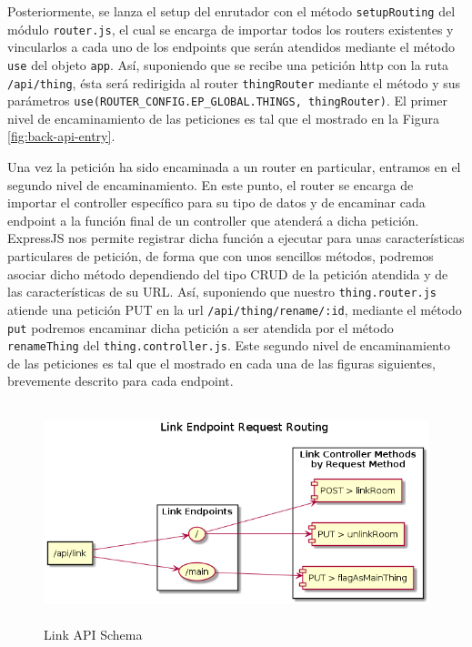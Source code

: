 \vspace{0.5cm}

Posteriormente, se lanza el setup del enrutador con el método \verb|setupRouting| del módulo \verb|router.js|, el cual se encarga de importar todos los routers existentes y vincularlos a cada uno de los endpoints que serán atendidos mediante el método \verb|use| del objeto \verb|app|. Así, suponiendo que se recibe una petición http con la ruta \verb|/api/thing|, ésta será redirigida al router \verb|thingRouter| mediante el método y sus parámetros \verb|use(ROUTER_CONFIG.EP_GLOBAL.THINGS, thingRouter)|. El primer nivel de encaminamiento de las peticiones es tal que el mostrado en la Figura \ref{fig:back-api-entry}.

\vspace{0.5cm}

Una vez la petición ha sido encaminada a un router en particular, entramos en el segundo nivel de encaminamiento. En este punto, el router se encarga de importar el controller específico para su tipo de datos y de encaminar cada endpoint a la función final de un controller que atenderá a dicha petición. ExpressJS nos permite registrar dicha función a ejecutar para unas características particulares de petición, de forma que con unos sencillos métodos, podremos asociar dicho método dependiendo del tipo CRUD de la petición atendida y de las características de su URL. Así, suponiendo que nuestro \verb|thing.router.js| atiende una petición PUT en la url \verb|/api/thing/rename/:id|, mediante el método \verb|put| podremos encaminar dicha petición a ser atendida por el método \verb|renameThing| del \verb|thing.controller.js|. Este segundo nivel de encaminamiento de las peticiones es tal que el mostrado en cada una de las figuras siguientes, brevemente descrito para cada endpoint.

\begin{figure}[hbt!]
\centering
\includegraphics[height=2.5in]{figures/diagrams/back/router-flow/link-endpoints.png}
\caption[link-endpoints]{Link API Schema\footnotemark}
\end{figure}

